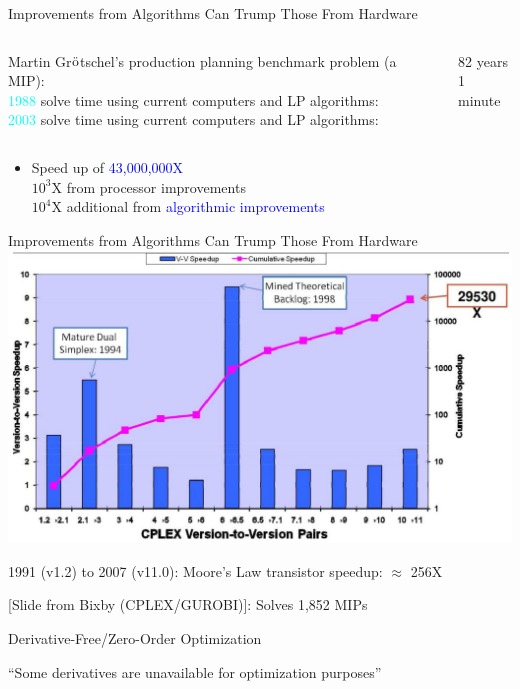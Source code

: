 \documentclass[handout,aspectratio=54]{beamer}
\numberwithin{theorem}{section}
\begin{document}
\begin{frame}{Improvements from Algorithms Can Trump Those From Hardware}
\begin{columns}
Martin Gr$\ddot{\textup{o}}$tschel’s production planning benchmark problem (a MIP):\\
\textcolor{cyan}{1988} solve time using current computers and LP algorithms: \\
\textcolor{cyan}{2003} solve time using current computers and LP algorithms:

{
\LARGE
82 years\\
1 minute
}
\end{columns}

\begin{itemize}
\item Speed up of \textcolor{blue}{43,000,000X}\\
$10^3$X from processor improvements\\
$10^4$X additional from \textcolor{blue}{algorithmic improvements}
\end{itemize}
\end{frame}

\begin{frame}{Improvements from Algorithms Can Trump Those From Hardware}
\includegraphics[width=\textwidth]{fig/4.jpg}
\centerline{
1991 (v1.2) to 2007 (v11.0): Moore’s Law transistor speedup: $\approx$ 256X
}
\centerline{
[\textcolor[RGB]{128,0,128}{Slide from Bixby (CPLEX/GUROBI)}]: Solves 1,852 MIPs
}
\end{frame}

\begin{frame}{Derivative-Free/Zero-Order Optimization}
\centerline{
“Some derivatives are unavailable for optimization purposes”
}
\vspace{7.5cm} 
\end{frame}
\end{document}
